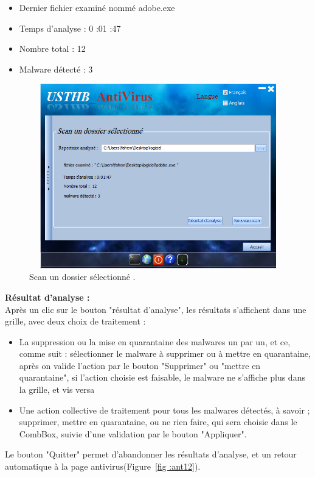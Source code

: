 \begin{list}{•}{}
\begin{itemize}
\item Dernier fichier examiné nommé adobe.exe
\item Temps d'analyse : 0 :01 :47
\item Nombre total : 12
\item Malware détecté : 3

\end{itemize}
\begin{figure}[H]
\begin{center}
\includegraphics[width=13cm, height=8cm]{Figures/ant13.png}
\caption{Scan un dossier sélectionné .}
\label{fig :ant13} 
\end{center}
\end{figure}
\item \textbf{Résultat d'analyse : }\\
Après un clic sur le bouton "résultat d'analyse", les résultats s'affichent dans une grille, avec deux choix de traitement :\\
\begin{itemize}
\item La suppression ou la mise en quarantaine des malwares un par un, et ce, comme suit :
sélectionner le malware à supprimer ou à  mettre en quarantaine, après on valide l'action par le bouton "Supprimer" ou "mettre en quarantaine", si l'action choisie est faisable, le malware ne s'affiche plus dans la grille, et vis versa  

\item Une action collective  de traitement  pour tous les malwares détectés, à savoir ; supprimer,  mettre en quarantaine, ou ne rien faire, qui sera choisie dans le  CombBox, suivie d'une validation par le bouton "Appliquer".\\
\end{itemize}


Le bouton "Quitter" permet d'abandonner les résultats d'analyse, et un retour automatique  à la page antivirus(Figure~\ref{fig :ant12}).\\
\end{list}
